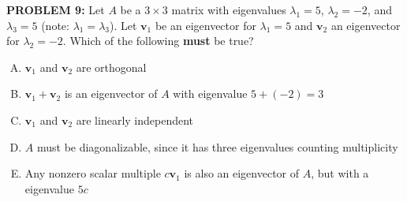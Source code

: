 \documentclass[12pt]{amsart}
\begin{document}
{\bf PROBLEM 9:}
%
Let $A$ be a $3 \times 3$ matrix with eigenvalues $\lambda_1 = 5$, 
$\lambda_2 = -2$, and $\lambda_3 = 5$ (note: $\lambda_1 = \lambda_3$). 
Let $\mathbf{v}_1$ be an eigenvector for $\lambda_1 = 5$ and $\mathbf{v}_2$ 
an eigenvector for $\lambda_2 = -2$.
%
Which of the following \textbf{must} be true?
\vspace{-0.1in}
\begin{enumerate}[(A)]
\item $\mathbf{v}_1$ and $\mathbf{v}_2$ are orthogonal
\item $\mathbf{v}_1 + \mathbf{v}_2$ is an eigenvector of $A$ with 
      eigenvalue $5 + (-2) = 3$
\item $\mathbf{v}_1$ and $\mathbf{v}_2$ are linearly independent
\item $A$ must be diagonalizable, since it has three eigenvalues 
      counting multiplicity
\item Any nonzero scalar multiple $c\mathbf{v}_1$ is also an eigenvector 
      of $A$, but with a eigenvalue $5c$
\end{enumerate}
\end{document}
